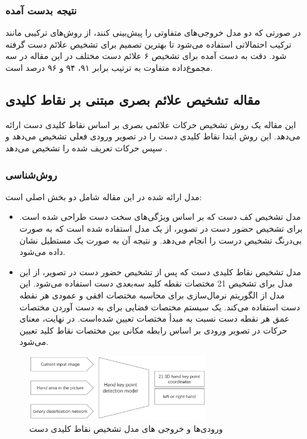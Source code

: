 \subsubsection{نتیجه بدست آمده}
در صورتی که دو مدل خروجی‌های متفاوتی را پیش‌بینی کنند، از روش‌های ترکیبی مانند ترکیب احتمالاتی استفاده می‌شود تا بهترین تصمیم برای تشخیص علائم دست گرفته شود.
دقت به دست آمده برای تشخیص ۶ علائم دست مختلف در این مقاله در سه مجموع‌داده متفاوت به ترتیب برابر ۹۱، ۹۴ و ۹۶ درصد است.




\subsection[مقاله تشخيص علائم بصری مبتنی بر نقاط کلیدی]{مقاله تشخيص علائم بصری مبتنی بر نقاط کلیدی \protect{}}
این مقاله یک روش تشخیص حرکات علائمی بصری بر اساس نقاط کلیدی دست ارائه می‌دهد. این روش ابتدا نقاط کلیدی دست را در تصویر ورودی فعلی تشخیص می‌دهد و سپس حرکات تعریف شده را تشخیص می‌دهد \cite{chen2021visual}.

\subsubsection{روش‌شناسی}
مدل ارائه شده در این مقاله شامل دو بخش اصلی است: 
\begin{itemize}
    \item مدل تشخیص کف دست که بر اساس ویژگی‌های سخت دست طراحی شده است. برای تشخیص حضور دست در تصویر، از یک مدل  استفاده شده است که به صورت بی‌درنگ
     تشخیص درست را انجام می‌دهد. و نتیجه آن به صورت یک مستطیل نشان داده می‌شود.
    \item    مدل تشخیص نقاط کلیدی دست که پس از تشخیص حضور دست در تصویر، از این مدل برای تشخیص 21 مختصات نقطه کلید سه‌بعدی دست استفاده می‌شود.  این مدل از الگوریتم نرمال‌سازی برای محاسبه مختصات افقی و عمودی هر نقطه 
    دست استفاده می‌کند. یک سیستم مختصات فضایی برای به دست آوردن مختصات عمق هر نقطه دست نسبت به مبدأ مختصات تعیین شده‌است. در نهایت، معنای حرکات در تصویر ورودی بر اساس رابطه مکانی بین مختصات نقاط کلید تعیین می‌شود.
     
\end{itemize}


\begin{figure}[h]
    \centering
    \includegraphics[width=0.7\textwidth]{keypoint.png}
    \caption[ورودی‌ها و خروجی های مدل تشخیص نقاط کلیدی دست]{ورودی‌ها و خروجی های مدل تشخیص نقاط کلیدی دست\cite{chen2021visual}}
\end{figure}

